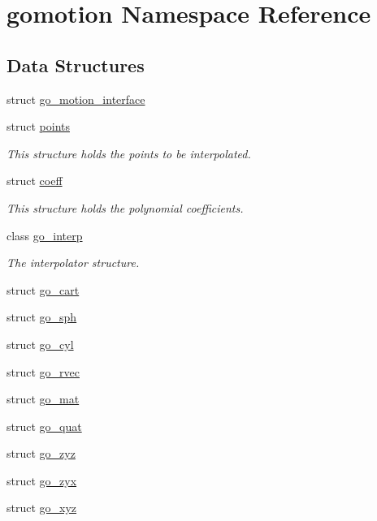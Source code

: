\hypertarget{namespacegomotion}{\section{gomotion Namespace Reference}
\label{namespacegomotion}
}
\subsection*{Data Structures}
\begin{DoxyCompactItemize}
\item 
struct \hyperlink{structgomotion_1_1go__motion__interface}{go\-\_\-motion\-\_\-interface}
\item 
struct \hyperlink{structgomotion_1_1points}{points}
\begin{DoxyCompactList}\small\item\em This structure holds the points to be interpolated. \end{DoxyCompactList}\item 
struct \hyperlink{structgomotion_1_1coeff}{coeff}
\begin{DoxyCompactList}\small\item\em This structure holds the polynomial coefficients. \end{DoxyCompactList}\item 
class \hyperlink{classgomotion_1_1go__interp}{go\-\_\-interp}
\begin{DoxyCompactList}\small\item\em The interpolator structure. \end{DoxyCompactList}\item 
struct \hyperlink{structgomotion_1_1go__cart}{go\-\_\-cart}
\item 
struct \hyperlink{structgomotion_1_1go__sph}{go\-\_\-sph}
\item 
struct \hyperlink{structgomotion_1_1go__cyl}{go\-\_\-cyl}
\item 
struct \hyperlink{structgomotion_1_1go__rvec}{go\-\_\-rvec}
\item 
struct \hyperlink{structgomotion_1_1go__mat}{go\-\_\-mat}
\item 
struct \hyperlink{structgomotion_1_1go__quat}{go\-\_\-quat}
\item 
struct \hyperlink{structgomotion_1_1go__zyz}{go\-\_\-zyz}
\item 
struct \hyperlink{structgomotion_1_1go__zyx}{go\-\_\-zyx}
\item 
struct \hyperlink{structgomotion_1_1go__xyz}{go\-\_\-xyz}

\end{DoxyCompactItemize}

